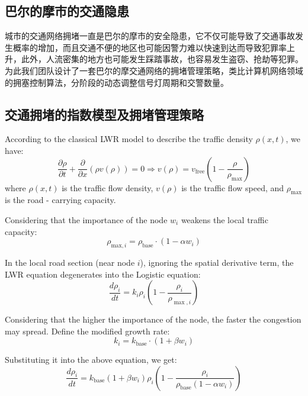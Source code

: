 \documentclass[12pt, a4paper, oneside]{ctexart}
\begin{document}
\subsection{巴尔的摩市的交通隐患}

城市的交通网络拥堵一直是巴尔的摩市的安全隐患，它不仅可能导致了交通事故发生概率的增加，而且交通不便的地区也可能因警力难以快速到达而导致犯罪率上升，此外，人流密集的地方也可能发生踩踏事故，也容易发生盗窃、抢劫等犯罪。为此我们团队设计了一套巴尔的摩交通网络的拥堵管理策略，类比计算机网络领域的拥塞控制算法，分阶段的动态调整信号灯周期和交警数量。

\subsection{交通拥堵的指数模型及拥堵管理策略}

According to the classical LWR model to describe the traffic density $\rho(x,t)$, we have:
\begin{equation}
\frac{\partial \rho}{\partial t} + \frac{\partial}{\partial x} \left( \rho v(\rho) \right) = 0\Rightarrow v(\rho) = v_{\text{free}} \left( 1 - \frac{\rho}{\rho_{\text{max}}} \right)
\end{equation}
where $\rho(x,t)$ is the traffic flow density, $v(\rho)$ is the traffic flow speed, and $\rho_{\text{max}}$ is the road - carrying capacity.

Considering that the importance of the node $w_i$ weakens the local traffic capacity:
\begin{equation}
\rho_{\text{max},i} = \rho_{\text{base}} \cdot \left( 1 - \alpha w_i \right)
\end{equation}

In the local road section (near node $i$), ignoring the spatial derivative term, the LWR equation degenerates into the Logistic equation:
\begin{equation}
\frac{d\rho_i}{dt}=k_i\rho_i\left(1-\frac{\rho_i}{\rho_{\max,i}}\right)
\end{equation}

Considering that the higher the importance of the node, the faster the congestion may spread. Define the modified growth rate:
\begin{equation}
k_i=k_{\mathrm{base}}\cdot(1+\beta w_i)
\end{equation}

Substituting it into the above equation, we get:
\begin{equation}
\frac{d\rho_i}{dt} = k_{\text{base}} (1 + \beta w_i) \rho_i \left( 1 - \frac{\rho_i}{\rho_{\text{base}} (1 - \alpha w_i)} \right)
\end{equation}
\end{document}

